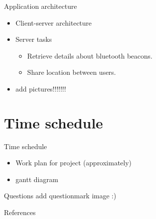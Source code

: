 \documentclass[9pt]{beamer}
\begin{document}
\begin{frame}{Application architecture}
	\begin{itemize}
	\item Client-server architecture
	\item Server tasks
		\begin{itemize}
			\item Retrieve details about bluetooth beacons. 
			\item Share location between users.
		\end{itemize}
	\item add pictures!!!!!!!
	\end{itemize}
\end{frame}

\section{Time schedule}

\begin{frame}{Time schedule}
	\begin{itemize}
	\item Work plan for project (approximately)
	\item gantt diagram
	\end{itemize}
\end{frame}

\begin{frame}{Questions}
	add questionmark image :) 
\end{frame}


\begin{frame}[allowframebreaks]{References}

\end{frame}
\end{document}
